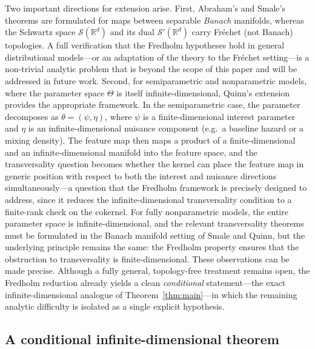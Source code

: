 \documentclass[11pt,a4paper]{article}
\newcommand{\R}{\mathbb{R}}
\newcommand{\cS}{\mathcal{S}}
\begin{document}
Two important directions for extension arise.  First, Abraham's and
Smale's theorems are formulated for maps between separable
\emph{Banach} manifolds, whereas the Schwartz space $\cS(\R^d)$ and
its dual $\cS'(\R^d)$ carry Fr\'echet (not Banach) topologies.  A
full verification that the Fredholm hypotheses hold in general
distributional models---or an adaptation of the theory to the
Fr\'echet setting---is a non-trivial analytic problem that is beyond
the scope of this paper and will be addressed in future work.
Second, for semiparametric and nonparametric models, where the
parameter space $\Theta$ is itself infinite-dimensional,
Quinn's extension~\cite{Quinn1979} provides the appropriate framework.
In the semiparametric case, the parameter decomposes as
$\theta = (\psi, \eta)$, where $\psi$ is a finite-dimensional
interest parameter and $\eta$ is an infinite-dimensional nuisance
component (e.g.\ a baseline hazard or a mixing density).  The
feature map then maps a product of a finite-dimensional and an
infinite-dimensional manifold into the feature space, and the
transversality question becomes whether the kernel can place
the feature map in generic position with respect to both the
interest and nuisance directions simultaneously---a question that
the Fredholm framework is precisely designed to address, since it
reduces the infinite-dimensional transversality condition to a
finite-rank check on the cokernel.  For fully
nonparametric models, the entire parameter space is
infinite-dimensional, and the relevant transversality theorems
must be formulated in the Banach manifold setting of Smale and
Quinn, but the underlying principle remains the same: the Fredholm
property ensures that the obstruction to transversality is
finite-dimensional.  These observations can be made precise.  Although a fully general,
topology-free treatment remains open, the Fredholm reduction already yields a
clean \emph{conditional} statement---the exact infinite-dimensional analogue of
Theorem~\ref{thm:main}---in which the remaining analytic difficulty is isolated
as a single explicit hypothesis.

\subsection{A conditional infinite-dimensional theorem}
\label{subsec:conditional-infinite}
\end{document}
